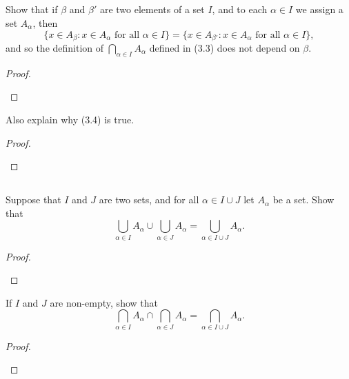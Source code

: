 \documentclass[../../main.tex]{subfiles}
\begin{document}
\addtocounter{subsection}{3}
\subsection{}
\begin{q}
    Show that if $\beta$ and $\beta'$ are two elements of a set $I$, and to each $\alpha \in I$ we assign a set $A_\alpha$, then \[
        \{
            x \in A_\beta : x \in A_\alpha \text{ for all } \alpha \in I
        \} = 
        \{
            x \in A_{\beta'} : x \in A_\alpha \text{ for all } \alpha \in I
        \},
    \]
    and so the definition of $\bigcap_{\alpha \in I} A_\alpha$ defined in (3.3) does not depend on $\beta$. 
\end{q}

\begin{proof}
    
    \begin{xx}
        
    \end{xx}
\end{proof}

\begin{q}
    Also explain why (3.4) is true.
\end{q}

\begin{proof}
    
    \begin{xx}
        
    \end{xx}
\end{proof}

\subsection{}
\begin{q}
    Suppose that $I$ and $J$ are two sets, and for all $\alpha \in I \cup J$ let $A_\alpha$ be a set. Show that
    \[\bigcup_{\alpha \in I} A_\alpha \cup \bigcup_{\alpha \in J} A_\alpha = \bigcup_{\alpha \in I \cup J} A_\alpha.\]
\end{q}

    \begin{proof}
    
        \begin{xx}
            
        \end{xx}
    \end{proof}

\begin{q}
    If $I$ and $J$ are non-empty, show that
    \[\bigcap_{\alpha \in I} A_\alpha \cap \bigcap_{\alpha \in J} A_\alpha = \bigcap_{\alpha \in I \cup J} A_\alpha.\]
\end{q}


\begin{proof}
    
    \begin{xx}
        
    \end{xx}
\end{proof}
\end{document}
